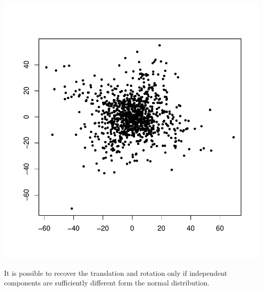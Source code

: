 \documentclass[landscape,footrule]{foils}
\begin{document}
\begin{center}
\includegraphics[scale=0.45]{ica-iii.pdf}
\end{center}\vspace*{-1cm}

It is possible to recover the translation and rotation only if independent components are sufficiently different form the normal distribution.  
\end{document}
